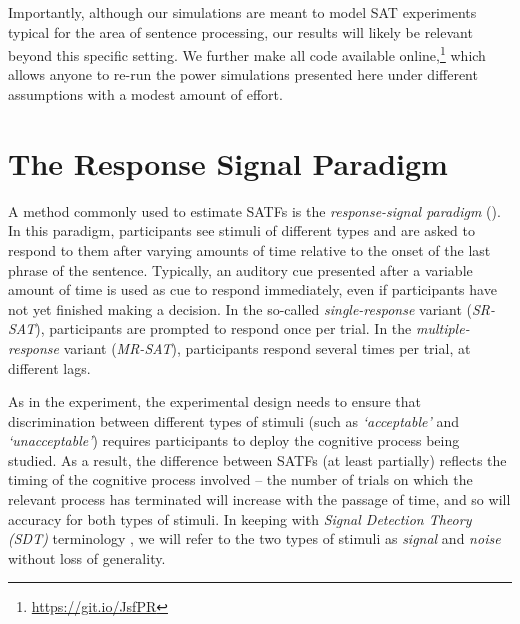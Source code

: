 \documentclass[10pt,letterpaper]{article}
\begin{document}
Importantly, although our simulations are meant to model SAT experiments typical for the area of sentence processing, our results will likely be relevant beyond this specific setting. We further 
make all code available online,\footnote{\url{https://git.io/JsfPR}} which allows anyone to re-run the power simulations presented here under different assumptions with a modest amount of effort.


\section{The Response Signal Paradigm}\label{the-response-signal-paradigm}

A method commonly used to estimate SATFs is the \textit{response-signal paradigm} (). In this paradigm, participants see stimuli of different types 
and are asked to respond to them after varying amounts of time relative to the onset of the last phrase of the sentence.
Typically, an auditory cue presented after a variable amount of time is used as cue to respond immediately, even if participants have not yet finished making a decision. In the so-called \textit{single-response} variant (\textit{SR-SAT}), participants are prompted to respond once per trial. In the \textit{multiple-response} variant (\textit{MR-SAT}), participants respond several times per trial, at different lags.

As in the  experiment, the experimental design needs to ensure that discrimination between different types of stimuli (such as \textit{`acceptable'} and \textit{`unacceptable'}) requires participants to deploy the cognitive process being studied. As a result, the difference between SATFs (at least partially) reflects the timing of the cognitive process involved -- the number of trials on which the relevant process has terminated will increase with the passage of time, and so will accuracy for both types of stimuli. In keeping with \textit{Signal Detection Theory (SDT)} terminology \cite{Wickens2001}, we will refer to the two types of stimuli as \textit{signal} and \textit{noise} without loss of generality.
\end{document}
